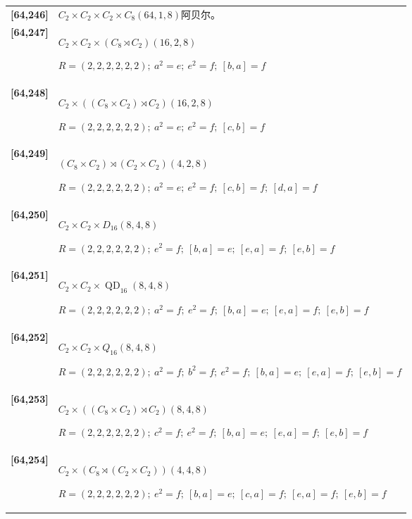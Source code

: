 \documentclass[UTF8,fontset=fandol,11pt,a4paper]{ctexart}
\begin{document}
\begin{longtable}{@{}p{17mm}>{\raggedright\arraybackslash}p{141mm}@{}}
\textbf{[64,246]} & $C_{2}\times C_{2}\times C_{2}\times C_{8}$\quad $(64,1,8)$\quad 阿贝尔。\\[3pt]

\textbf{[64,247]} & $C_{2}\times C_{2}\times (C_{8}\rtimes C_{2})$\quad $(16,2,8)$\par\(R=(2,2,2,2,2,2);\allowbreak\ a^{2}=e;\allowbreak\ e^{2}=f;\allowbreak\ [b,a]=f\)\\[3pt]

\textbf{[64,248]} & $C_{2}\times ((C_{8}\times C_{2})\rtimes C_{2})$\quad $(16,2,8)$\par\(R=(2,2,2,2,2,2);\allowbreak\ a^{2}=e;\allowbreak\ e^{2}=f;\allowbreak\ [c,b]=f\)\\[3pt]

\textbf{[64,249]} & $(C_{8}\times C_{2})\rtimes (C_{2}\times C_{2})$\quad $(4,2,8)$\par\(R=(2,2,2,2,2,2);\allowbreak\ a^{2}=e;\allowbreak\ e^{2}=f;\allowbreak\ [c,b]=f;\allowbreak\ [d,a]=f\)\\[3pt]

\textbf{[64,250]} & $C_{2}\times C_{2}\times D_{16}$\quad $(8,4,8)$\par\(R=(2,2,2,2,2,2);\allowbreak\ e^{2}=f;\allowbreak\ [b,a]=e;\allowbreak\ [e,a]=f;\allowbreak\ [e,b]=f\)\\[3pt]

\textbf{[64,251]} & $C_{2}\times C_{2}\times \operatorname{QD}_{16}$\quad $(8,4,8)$\par\(R=(2,2,2,2,2,2);\allowbreak\ a^{2}=f;\allowbreak\ e^{2}=f;\allowbreak\ [b,a]=e;\allowbreak\ [e,a]=f;\allowbreak\ [e,b]=f\)\\[3pt]

\textbf{[64,252]} & $C_{2}\times C_{2}\times Q_{16}$\quad $(8,4,8)$\par\(R=(2,2,2,2,2,2);\allowbreak\ a^{2}=f;\allowbreak\ b^{2}=f;\allowbreak\ e^{2}=f;\allowbreak\ [b,a]=e;\allowbreak\ [e,a]=f;\allowbreak\ [e,b]=f\)\\[3pt]

\textbf{[64,253]} & $C_{2}\times ((C_{8}\times C_{2})\rtimes C_{2})$\quad $(8,4,8)$\par\(R=(2,2,2,2,2,2);\allowbreak\ c^{2}=f;\allowbreak\ e^{2}=f;\allowbreak\ [b,a]=e;\allowbreak\ [e,a]=f;\allowbreak\ [e,b]=f\)\\[3pt]

\textbf{[64,254]} & $C_{2}\times (C_{8}\rtimes (C_{2}\times C_{2}))$\quad $(4,4,8)$\par\(R=(2,2,2,2,2,2);\allowbreak\ e^{2}=f;\allowbreak\ [b,a]=e;\allowbreak\ [c,a]=f;\allowbreak\ [e,a]=f;\allowbreak\ [e,b]=f\)\\[3pt]


\end{longtable}
\end{document}
